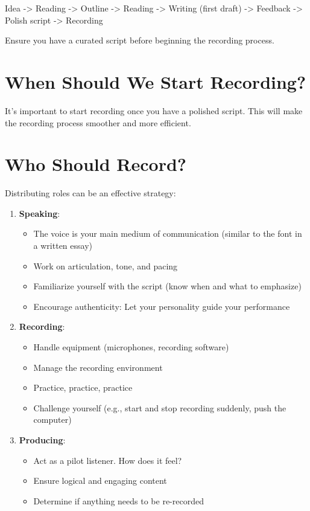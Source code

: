 \documentclass[
  letterpaper,
  DIV=11,
  numbers=noendperiod]{scrreprt}
\providecommand{\tightlist}{%
  \setlength{\itemsep}{0pt}\setlength{\parskip}{0pt}}\usepackage{longtable,booktabs,array}
\begin{document}
Idea -\textgreater{} Reading -\textgreater{} Outline -\textgreater{}
Reading -\textgreater{} Writing (first draft) -\textgreater{} Feedback
-\textgreater{} Polish script -\textgreater{} Recording

Ensure you have a curated script before beginning the recording process.

\section{When Should We Start
Recording?}\label{when-should-we-start-recording}

It's important to start recording once you have a polished script. This
will make the recording process smoother and more efficient.

\section{Who Should Record?}\label{who-should-record}

Distributing roles can be an effective strategy:

\begin{enumerate}
\def\labelenumi{\arabic{enumi}.}
\tightlist
\item
  \textbf{Speaking}:

  \begin{itemize}
  \tightlist
  \item
    The voice is your main medium of communication (similar to the font
    in a written essay)
  \item
    Work on articulation, tone, and pacing
  \item
    Familiarize yourself with the script (know when and what to
    emphasize)
  \item
    Encourage authenticity: Let your personality guide your performance
  \end{itemize}
\item
  \textbf{Recording}:

  \begin{itemize}
  \tightlist
  \item
    Handle equipment (microphones, recording software)
  \item
    Manage the recording environment
  \item
    Practice, practice, practice
  \item
    Challenge yourself (e.g., start and stop recording suddenly, push
    the computer)
  \end{itemize}
\item
  \textbf{Producing}:

  \begin{itemize}
  \tightlist
  \item
    Act as a pilot listener. How does it feel?
  \item
    Ensure logical and engaging content
  \item
    Determine if anything needs to be re-recorded
  \end{itemize}
\end{enumerate}
\end{document}
